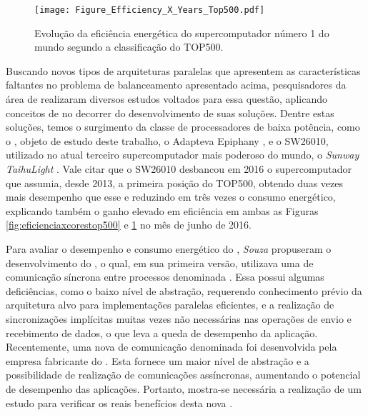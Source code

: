 \begin{figure}[tb]
  \centering
  \caption{Evolução da eficiência energética do supercomputador número 1 do mundo segundo a classificação do TOP500.}
  \label{fig:eficienciaxyearstop500}
  \texttt{[image: Figure\_Efficiency\_X\_Years\_Top500.pdf]}
\end{figure}

Buscando novos tipos de arquiteturas paralelas que apresentem as características faltantes no problema de balanceamento apresentado acima, pesquisadores da área de \textit{\HPC} realizaram diversos estudos voltados para essa questão, aplicando conceitos de \greencomputing \cite{greencomputingacm} no decorrer do desenvolvimento de suas soluções. Dentre estas soluções, temos o surgimento da classe de processadores \manycore de baixa potência, como o \mppa \cite{mppa2562013}, objeto de estudo deste trabalho, o Adapteva Epiphany \cite{olofsson2014}, e o SW26010, utilizado no atual terceiro supercomputador mais poderoso do mundo, o \textit{Sunway TaihuLight} \cite{fu2016sunway}. Vale citar que o SW26010 desbancou em 2016 o supercomputador que assumia, desde 2013, a primeira posição do TOP500, obtendo duas vezes mais desempenho que esse e reduzindo em três vezes o consumo energético, explicando também o ganho elevado em eficiência em ambas as Figuras \ref{fig:eficienciaxcorestop500} e \ref{fig:eficienciaxyearstop500} no mês de junho de 2016.

Para avaliar o desempenho e consumo energético do \mppa, \textit{Souza} \etal \cite{Castro-Souza-CCPE:2016} propuseram o desenvolvimento do \bench \capb, o qual, em sua primeira versão, utilizava uma \textit{\API} de comunicação síncrona entre processos denominada \textit{\IPC} \cite{mppa2562013}. Essa \API possui algumas deficiências, como o baixo nível de abstração, requerendo conhecimento prévio da arquitetura alvo para implementações paralelas eficientes, e a realização de sincronizações implícitas muitas vezes não necessárias nas operações de envio e recebimento de dados, o que leva a queda de desempenho da aplicação. Recentemente, uma nova \API de comunicação denominada \textit{\ASYNC} foi desenvolvida pela empresa fabricante do  \mppa. Esta \API fornece um maior nível de abstração e a possibilidade de realização de comunicações assíncronas, aumentando o potencial de desempenho das aplicações. Portanto, mostra-se necessária a realização de um estudo para verificar os reais benefícios desta nova \API.


